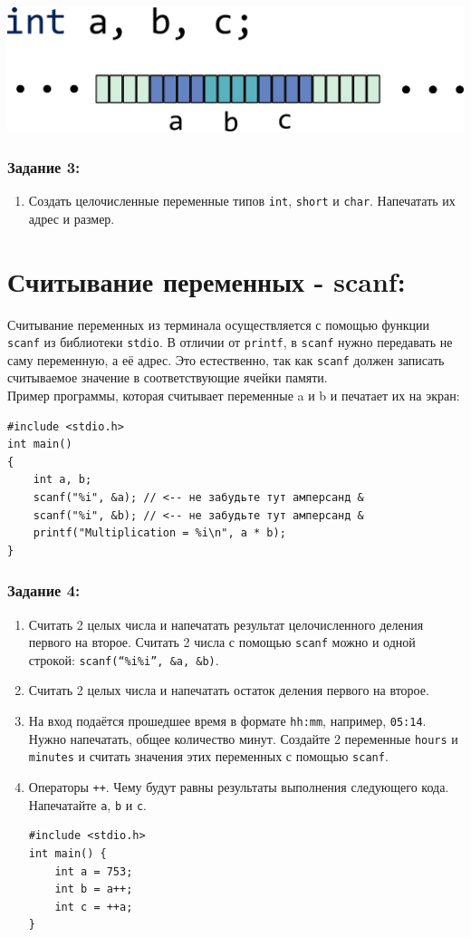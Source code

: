 \documentclass{article}
\begin{document}
\includegraphics[scale=0.8]{../images/memory_ints.png}

\subsubsection*{Задание 3:}
\begin{enumerate}
\item Создать целочисленные переменные типов \texttt{int}, \texttt{short} и \texttt{char}. Напечатать их адрес и размер.
\end{enumerate}

\section*{Считывание переменных - scanf:}
Считывание переменных из терминала осуществляется с помощью функции \texttt{scanf} из библиотеки \texttt{stdio}. В отличии от \texttt{printf}, в \texttt{scanf} нужно передавать не саму переменную, а её адрес. Это естественно, так как \texttt{scanf} должен записать считываемое значение в соответствующие ячейки памяти.\\
Пример программы, которая считывает переменные a и b и печатает их на экран:
\begin{lstlisting}
#include <stdio.h>
int main() 
{
    int a, b;
    scanf("%i", &a); // <-- не забудьте тут амперсанд &
    scanf("%i", &b); // <-- не забудьте тут амперсанд &
    printf("Multiplication = %i\n", a * b);
}
\end{lstlisting}
\subsubsection*{Задание 4:}
\begin{enumerate}
\item Считать 2 целых числа и напечатать результат целочисленного деления первого на второе. Считать 2 числа с помощью \texttt{scanf} можно и одной строкой: \texttt{scanf(``\%i\%i'', \&a, \&b)}.
\item Считать 2 целых числа и напечатать остаток деления первого на второе.
\item На вход подаётся прошедшее время в формате \texttt{hh:mm}, например, \texttt{05:14}. Нужно напечатать, общее количество минут. Создайте 2 переменные \texttt{hours} и \texttt{minutes} и считать значения этих переменных с помощью \texttt{scanf}. 
\item Операторы \texttt{++}. Чему будут равны результаты выполнения следующего кода. Напечатайте \texttt{a}, \texttt{b} и \texttt{c}.
\begin{lstlisting}
#include <stdio.h>
int main() {
    int a = 753;
    int b = a++;
    int c = ++a;
}
\end{lstlisting}
\end{enumerate}
\end{document}
